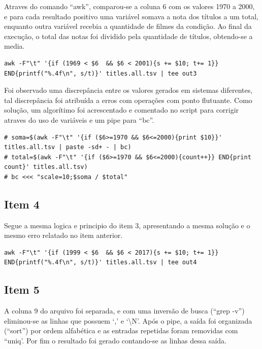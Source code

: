 \documentclass[12pt]{article}
\begin{document}
Atraves do comando ``awk'', comparou-se a coluna 6 com os valores 1970 a 2000, e para cada resultado positivo uma variável somava a nota dos títulos a um total, enquanto outra variável recebia a quantidade de filmes da condição. Ao final da execução, o total das notas foi dividido pela quantidade de títulos, obtendo-se a media.

\begin{verbatim}
awk -F"\t" '{if (1969 < $6  && $6 < 2001){s += $10; t+= 1}} END{printf("%.4f\n", s/t)}' titles.all.tsv | tee out3
\end{verbatim}

Foi observado uma discrepância entre os valores gerados em sistemas diferentes, tal discrepância foi atribuída a erros com operações com ponto flutuante. Como solução, um algorítimo foi acrescentado e comentado no script para corrigir atraves do uso de variáveis e um pipe para ``bc''.

\begin{verbatim}
# soma=$(awk -F"\t" '{if ($6>=1970 && $6<=2000){print $10}}' titles.all.tsv | paste -sd+ - | bc) 
# total=$(awk -F"\t" '{if ($6>=1970 && $6<=2000){count++}} END{print count}' titles.all.tsv)
# bc <<< "scale=10;$soma / $total"
\end{verbatim}

\subsection*{Item 4}

Segue a mesma logica e principio do item 3, apresentando a mesma solução e o mesmo erro relatado no item anterior.

\begin{verbatim}
awk -F"\t" '{if (1999 < $6  && $6 < 2017){s += $10; t+= 1}} END{printf("%.4f\n", s/t)}' titles.all.tsv | tee out4
\end{verbatim}

\subsection*{Item 5}

A coluna 9 do arquivo foi separada, e com uma inversão de busca (``grep -v'') eliminou-se as linhas que possuem `,' e `\textbackslash	N'. Após o pipe, a saída foi organizada (``sort'') por ordem alfabética e as entradas repetidas foram removidas com ``uniq'. Por fim o resultado foi gerado contando-se as linhas dessa saída.
\end{document}
